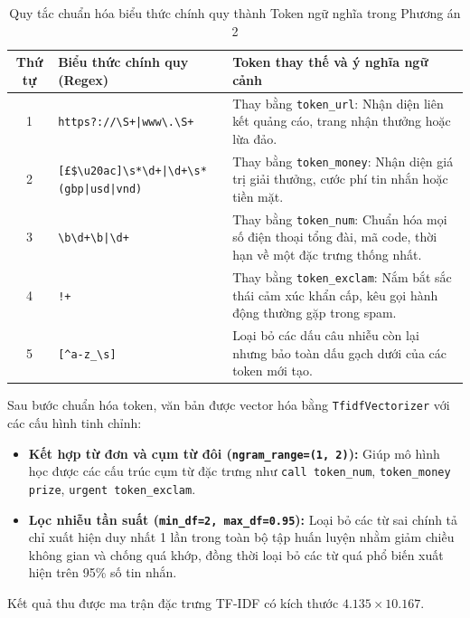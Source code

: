 \documentclass[12pt,a4paper]{report}
\begin{document}
\begin{table}[H]
    \centering
    \caption{Quy tắc chuẩn hóa biểu thức chính quy thành Token ngữ nghĩa trong Phương án 2}
    \label{tab:regex_rules}
    \begin{tabular}{clp{6.2cm}}
        \toprule
        \textbf{Thứ tự} & \textbf{Biểu thức chính quy (Regex)} & \textbf{Token thay thế và ý nghĩa ngữ cảnh} \\
        \midrule
        1 & \texttt{https?://\textbackslash S+|www\textbackslash.\textbackslash S+} & Thay bằng \texttt{token\_url}: Nhận diện liên kết quảng cáo, trang nhận thưởng hoặc lừa đảo. \\
        2 & \texttt{[\pounds\$\textbackslash u20ac]\textbackslash s*\textbackslash d+|\textbackslash d+\textbackslash s*(gbp|usd|vnd)} & Thay bằng \texttt{token\_money}: Nhận diện giá trị giải thưởng, cước phí tin nhắn hoặc tiền mặt. \\
        3 & \texttt{\textbackslash b\textbackslash d+\textbackslash b|\textbackslash d+} & Thay bằng \texttt{token\_num}: Chuẩn hóa mọi số điện thoại tổng đài, mã code, thời hạn về một đặc trưng thống nhất. \\
        4 & \texttt{!+} & Thay bằng \texttt{token\_exclam}: Nắm bắt sắc thái cảm xúc khẩn cấp, kêu gọi hành động thường gặp trong spam. \\
        5 & \texttt{[\^{}a-z\_\textbackslash s]} & Loại bỏ các dấu câu nhiễu còn lại nhưng bảo toàn dấu gạch dưới của các token mới tạo. \\
        \bottomrule
    \end{tabular}
\end{table}

Sau bước chuẩn hóa token, văn bản được vector hóa bằng \texttt{TfidfVectorizer} với các cấu hình tinh chỉnh:
\begin{itemize}
    \item \textbf{Kết hợp từ đơn và cụm từ đôi (\texttt{ngram\_range=(1, 2)}):} Giúp mô hình học được các cấu trúc cụm từ đặc trưng như \texttt{call token\_num}, \texttt{token\_money prize}, \texttt{urgent token\_exclam}.
    \item \textbf{Lọc nhiễu tần suất (\texttt{min\_df=2, max\_df=0.95}):} Loại bỏ các từ sai chính tả chỉ xuất hiện duy nhất 1 lần trong toàn bộ tập huấn luyện nhằm giảm chiều không gian và chống quá khớp, đồng thời loại bỏ các từ quá phổ biến xuất hiện trên 95\% số tin nhắn.
\end{itemize}
Kết quả thu được ma trận đặc trưng TF-IDF có kích thước $4.135 \times 10.167$.
\end{document}
